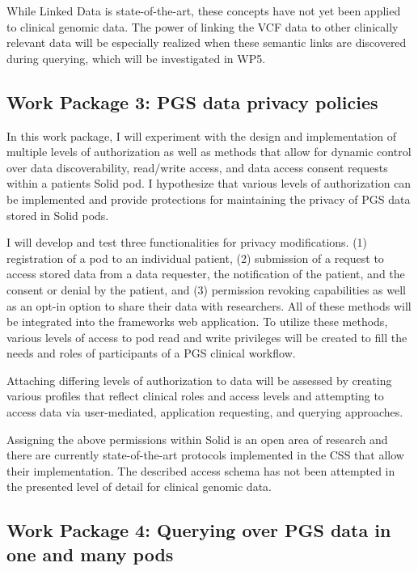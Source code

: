 \documentclass[a4paper,11pt]{article}
\begin{document}
While Linked Data is state-of-the-art, these concepts have not yet been applied to clinical genomic data.
The power of linking the VCF data to other clinically relevant data will be especially realized when these semantic links are discovered during querying, which will be investigated in WP5. 


\subsection{Work Package 3: PGS data privacy policies}

In this work package, I will experiment with the design and implementation of multiple levels of authorization as well as methods that allow for dynamic control over data discoverability, read/write access, and data access consent requests within a patient\textquotesingle s Solid pod. 
I hypothesize that various levels of authorization can be implemented and provide protections for maintaining the privacy of PGS data stored in Solid pods.

I will develop and test three functionalities for privacy modifications.
(1) registration of a pod to an individual patient,
(2) submission of a request to access stored data from a data requester, the notification of the patient, and the consent or denial by the patient, and
(3) permission revoking capabilities as well as an opt-in option to share their data with researchers. 
All of these methods will be integrated into the framework\textquotesingle s web application.
To utilize these methods, various levels of access to pod read and write privileges will be created to fill the needs and roles of participants of a PGS clinical workflow. 

Attaching differing levels of authorization to data will be assessed by creating various profiles that reflect clinical roles and access levels and attempting to access data via user-mediated, application requesting, and querying approaches. 

Assigning the above permissions within Solid is an open area of research and there are currently state-of-the-art protocols implemented in the CSS that allow their implementation.
The described access schema has not been attempted in the presented level of detail for clinical genomic data.


\subsection{Work Package 4: Querying over PGS data in one and many pods}
\end{document}
